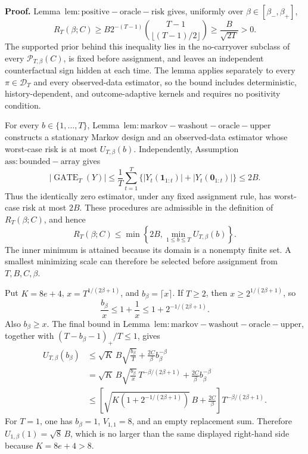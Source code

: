 \textbf{Proof.} Lemma~\(\mathrm{lem:positive-oracle-risk}\) gives, uniformly over \(\beta\in[\beta_-,\beta_+]\),
\[
R_T(\beta;C)
\ge B2^{-(T-1)}\binom{T-1}{\lfloor(T-1)/2\rfloor}
\ge\frac{B}{\sqrt{2T}}>0.
\]
The supported prior behind this inequality lies in the no-carryover subclass of every \(\mathcal P_{T,\beta}(C)\), is fixed before assignment, and leaves an independent counterfactual sign hidden at each time. The lemma applies separately to every \(\pi\in\mathcal D_T\) and every observed-data estimator, so the bound includes deterministic, history-dependent, and outcome-adaptive kernels and requires no positivity condition.

For every \(b\in\{1,\ldots,T\}\), Lemma~\(\mathrm{lem:markov-washout-oracle-upper}\) constructs a stationary Markov design and an observed-data estimator whose worst-case risk is at most \(U_{T,\beta}(b)\). Independently, Assumption~\(\mathrm{ass:bounded-array}\) gives
\[
|\operatorname{GATE}_T(Y)|
\le\frac1T\sum_{t=1}^T\{|Y_t(\mathbf1_{1:t})|+|Y_t(\mathbf0_{1:t})|\}
\le2B.
\]
Thus the identically zero estimator, under any fixed assignment rule, has worst-case risk at most \(2B\). These procedures are admissible in the definition of \(R_T(\beta;C)\), and hence
\[
R_T(\beta;C)
\le\min\left\{2B,\min_{1\le b\le T}U_{T,\beta}(b)\right\}.
\]
The inner minimum is attained because its domain is a nonempty finite set. A smallest minimizing scale can therefore be selected before assignment from \(T,B,C,\beta\).

Put \(K=8e+4\), \(x=T^{1/(2\beta+1)}\), and \(b_\beta=\lceil x\rceil\). If \(T\ge2\), then \(x\ge2^{1/(2\beta+1)}\), so
\[
\frac{b_\beta}{x}\le1+\frac1x\le1+2^{-1/(2\beta+1)}.
\]
Also \(b_\beta\ge x\). The final bound in Lemma~\(\mathrm{lem:markov-washout-oracle-upper}\), together with \((T-b_\beta-1)_+/T\le1\), gives
\[
\begin{aligned}
U_{T,\beta}(b_\beta)
&\le \sqrt K\,B\sqrt{\frac{b_\beta}{T}}+\frac{2C}{\beta}b_\beta^{-\beta}\\
&=\sqrt K\,B\sqrt{\frac{b_\beta}{x}}\,T^{-\beta/(2\beta+1)}
 +\frac{2C}{\beta}b_\beta^{-\beta}\\
&\le\left[\sqrt{K\left(1+2^{-1/(2\beta+1)}\right)}\,B+\frac{2C}{\beta}\right]T^{-\beta/(2\beta+1)}.
\end{aligned}
\]
For \(T=1\), one has \(b_\beta=1\), \(V_{1,1}=8\), and an empty replacement sum. Therefore \(U_{1,\beta}(1)=\sqrt8\,B\), which is no larger than the same displayed right-hand side because \(K=8e+4>8\).

